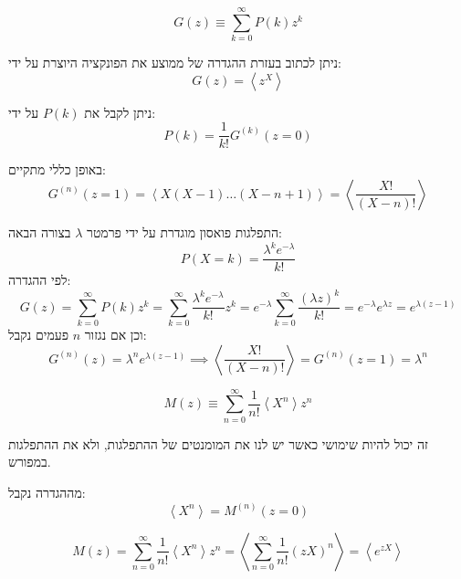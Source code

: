 \documentclass{tstextbook}
\begin{document}
\begin{definition}
$$G\left(z\right)\equiv\sum_{k=0}^{\infty}P\left(k\right)z^{k}$$

\end{definition}
\begin{proposition}
ניתן לכתוב בעזרת ההגדרה של ממוצע את הפונקציה היוצרת על ידי:
$$G\left(z\right)=\left\langle z^{X}\right\rangle$$

\end{proposition}
\begin{proposition}
ניתן לקבל את \(P(k)\) על ידי:
$$P\left(k\right)=\frac{1}{k!}G^{\left(k\right)}\left(z=0\right)$$

\end{proposition}
\begin{proposition}
באופן כללי מתקיים:
$$G^{(n)}\left(z=1\right)=\left\langle X\left(X-1\right)\ldots\left(X-n+1\right)\right\rangle=\left\langle{\frac{X!}{(X-n)!}}\right\rangle$$

\end{proposition}
\begin{example}
התפלגות פואסון מוגדרת על ידי פרמטר \(\lambda\) בצורה הבאה:
$$P\left(X=k\right)=\frac{\lambda^{k}e^{-\lambda}}{k!}$$
לפי ההגדרה:
$$G\left(z\right)=\sum_{k=0}^{\infty}P\left(k\right)z^{k}=\sum_{k=0}^{\infty}\frac{\lambda^{k}e^{-\lambda}}{k!}z^{k}=e^{-\lambda}\sum_{k=0}^{\infty}\frac{\left(\lambda z\right)^{k}}{k!}=e^{-\lambda}e^{\lambda z}=e^{\lambda(z-1)}$$
וכן אם נגזור \(n\) פעמים נקבל:
$$G^{(n)}\left(z\right)=\lambda^{n}e^{\lambda(z-1)}\implies \left\langle{\frac{X!}{(X-n)!}}\right\rangle=G^{(n)}\left(z=1\right)=\lambda^{n}$$

\end{example}
\begin{definition}
$$M\left(z\right)\equiv\sum_{n=0}^{\infty}\frac{1}{n!}\left\langle X^{n}\right\rangle z^{n}$$

\end{definition}
\begin{remark}
זה יכול להיות שימושי כאשר יש לנו את המומנטים של ההתפלגות, ולא את ההתפלגות במפורש.

\end{remark}
\begin{proposition}
מההגדרה נקבל:
$$\left\langle X^{n}\right\rangle=M^{(n)}\left(z=0\right)$$

\end{proposition}
\begin{proposition}
$$M\left(z\right)=\sum_{n=0}^{\infty}\frac{1}{n!}\left\langle X^{n}\right\rangle z^{n}=\left\langle\sum_{n=0}^{\infty}\frac{1}{n!}\left(z X\right)^{n}\right\rangle=\left\langle e^{z X}\right\rangle$$

\end{proposition}
\end{document}
